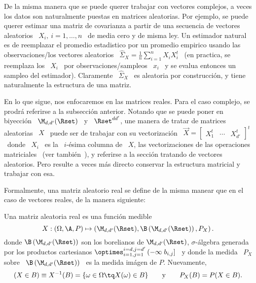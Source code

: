 \label{Ssec:MP:MA}

De la misma manera que se  puede querer trabajar con vectores complejos, a veces
los datos son naturalmente puestas en matrices aleatorias. Por ejemplo, se puede
querer estimar  una matriz de covarianza  a partir de una  secuencia de vectores
aleatorios \  $X_i, \: i =  1, \ldots ,  n$ \ de media  cero y de misma  ley. Un
estimador  natural es  de reemplazar  el  promedio estadistico  por un  promedio
empirico usando las  observaciones/los vectores aleatorios \ $\widehat{\Sigma}_X
= \frac1n \sum_{i=1}^n X_i X_i^t$ \ (en practica, se reemplaza los \ $X_i$ \ por
observaciones/sampleos  \  $x_i$   \  y  se  evalua  entonces   un  sampleo  del
estimador). Claramente \ $\widehat{\Sigma}_X$ \ es aleatoria por construcci\'on,
y tiene naturalmente la estructura de una matriz.

En lo que sigue, nos enfocaremos  en las matrices reales. Para el caso complejo,
se prodr\'a referirse a la subsecci\'on  anterior. Notando que se puede poner en
biyecci\'on \ $\M_{d,d'}(\Rset)$  \ y \ $\Rset^{d d'}$, une  manera de tratar de
matrices  aleatorias \  $X$ \  puede ser  de trabajar  con su  vectorizaci\'on \
$\vec{X} = \begin{bmatrix} X_1^t &  \cdots & X_{d'}^t \end{bmatrix}^t$ \ donde \
$X_i$  \ es  la  \ $i$-\'esima  columna de  \  $X$, las  vectorizaciones de  las
operaciones  matriciales~\cite[Cap.~2]{MagNeu79}  (ver tambi\'en~\cite{NeuWan83,
  Har08}), y  referirse a  la secci\'on tratando  de vectores  aleatorios.  Pero
resulte a veces  m\'as directo conservar la estructura  matricial y trabajar con
esa.

Formalmente, una  matriz aleatorio real se define  de la misma manear  que en el
caso de vectores reales, de la manera siguiente:
%
\begin{definicion}
\label{Def:MP:MatrizAleatorioaReal}
%
  Una matriz aleatoria real es una funci\'on medible
  \[
  X:  (\Omega,\A,P) \mapsto  \left( \M_{d,d'}(\Rset)  ,  \B\left( \M_{d,d'}(\Rset)
    \right) , P_X \right).
  \]
  donde   $\B\left(    \M_{d,d'}(\Rset)   \right)$   son    los   borelianos   de
  $\M_{d,d'}(\Rset)$, $\sigma$-\'algebra  generada por los  productos cartesianos
  $\optimes_{i=1,j=1}^{i=d,j=d'}  \left( -\infty \;  b_{i,j} \right]$  \ y
  donde la  medida \ $P_X$  sobre \ $\B\left(  \M_{d,d'}(\Rset) \right)$ \  es la
  medida im\'agen de $P$. Nuevamente,
  \[
  (X \in  B) \equiv  X^{-1}(B) =  \{ \omega \in  \Omega \tq  X(\omega) \in  B \}
  \qquad \mbox{y} \qquad P_X(B) = P(X \in B).
  \]
\end{definicion}

